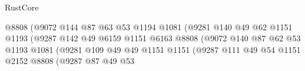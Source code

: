 \begin{lexlean}{RustCore}
\begin{coremodule}
                                              @8808
                                              (@9072
                                                @144
                                                @87
                                                @63
                                                @53
                                                @1194
                                                @1081
                                                (@9281
                                                  @140
                                                  @49
                                                  @62
                                                  @1151
                                                  @1193
                                                  (@9287
                                                    @142
                                                    @49
                                                    @6159
                                                    @1151
                                                    @6163
                                                    @8808
                                                    (@9072
                                                      @140
                                                      @87
                                                      @62
                                                      @53
                                                      @1193
                                                      @1081
                                                      (@9281
                                                        @109
                                                        @49
                                                        @49
                                                        @1151
                                                        @1151
                                                        (@9287
                                                          @111
                                                          @49
                                                          @54
                                                          @1151
                                                          @2152
                                                          @8808
                                                          (@9287
                                                            @87
                                                            @49
                                                            @53

\end{coremodule}
\end{lexlean}
